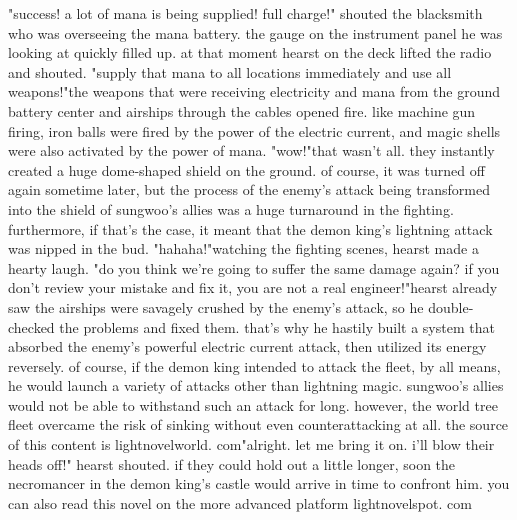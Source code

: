 "success! a lot of mana is being supplied! full charge!" shouted the blacksmith who was overseeing the mana battery.
 the gauge on the instrument panel he was looking at quickly filled up.
 at that moment hearst on the deck lifted the radio and shouted.
"supply that mana to all locations immediately and use all weapons!"the weapons that were receiving electricity and mana from the ground battery center and airships through the cables opened fire.
 like machine gun firing, iron balls were fired by the power of the electric current, and magic shells were also activated by the power of mana.
"wow!"that wasn't all.
 they instantly created a huge dome-shaped shield on the ground.
of course, it was turned off again sometime later, but the process of the enemy's attack being transformed into the shield of sungwoo's allies was a huge turnaround in the fighting.
 furthermore, if that's the case, it meant that the demon king's lightning attack was nipped in the bud.
"hahaha!"watching the fighting scenes, hearst made a hearty laugh.
 "do you think we're going to suffer the same damage again? if you don't review your mistake and fix it, you are not a real engineer!"hearst already saw the airships were savagely crushed by the enemy's attack, so he double-checked the problems and fixed them.
 that's why he hastily built a system that absorbed the enemy's powerful electric current attack, then utilized its energy reversely.
of course, if the demon king intended to attack the fleet, by all means, he would launch a variety of attacks other than lightning magic.
 sungwoo's allies would not be able to withstand such an attack for long.
however, the world tree fleet overcame the risk of sinking without even counterattacking at all.
the source of this content is lightnov­elworld.
c‌om"alright.
 let me bring it on.
 i'll blow their heads off!" hearst shouted.
if they could hold out a little longer, soon the necromancer in the demon king's castle would arrive in time to confront him.
 you can also read this novel on the more advanced platform lightnovelspot.
com

 